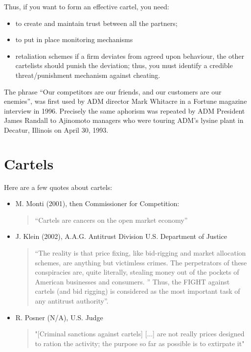             Thus, if you want to form an effective cartel, you need:

            \begin{itemize}
                \item to create and maintain trust between all the partners;
                \item to put in place monitoring mechanisms
                \item retaliation schemes if a firm deviates from agreed upon behaviour, the other cartelists should punish the deviation; thus, you must identify a credible threat/punishment mechanism against cheating.
            \end{itemize}

            The phrase “Our competitors are our friends, and our customers are our enemies”, was first used by ADM director Mark Whitacre in a Fortune magazine interview in 1996. Precisely the same aphorism was repeated by ADM President James Randall to Ajinomoto managers who were touring ADM’s lysine plant in Decatur, Illinois on April 30, 1993.

\section{Cartels}

    Here are a few quotes about cartels:
    \begin{itemize}
        \item M. Monti (2001), then Commissioner for Competition:
            \begin{quote}
                “Cartels are cancers on the open market economy”
            \end{quote}
        \item J. Klein (2002), A.A.G. Antitrust Division U.S. Department of Justice
            \begin{quote}
                “The reality is that price fixing, like bid-rigging and market allocation schemes, are anything but victimless crimes. The perpetrators of these conspiracies are, quite literally, stealing money out of the pockets of American businesses and consumers. ” Thus, the FIGHT against cartels (and bid rigging) is considered as the most important task of any antitrust authority”.
            \end{quote}
        \item R. Posner (N/A), U.S. Judge
            \begin{quote}
                "[Criminal sanctions against cartels] [...] are not really prices designed to ration the activity; the purpose so far as possible is to extirpate it"
            \end{quote}
    \end{itemize}

